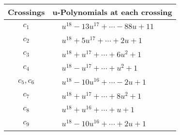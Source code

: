 \documentclass[1p]{elsarticle_modified}
\theoremstyle{definition}
\begin{document}
\begin{tabular}{m{50pt}|m{274pt}}
Crossings & \hspace{64pt}u-Polynomials at each crossing \\
\hline $$\begin{aligned}c_{1}\end{aligned}$$&$\begin{aligned}
&u^{18}-13 u^{17}+\cdots-88 u+11
\end{aligned}$\\
\hline $$\begin{aligned}c_{2}\end{aligned}$$&$\begin{aligned}
&u^{18}+5 u^{17}+\cdots+2 u+1
\end{aligned}$\\
\hline $$\begin{aligned}c_{3}\end{aligned}$$&$\begin{aligned}
&u^{18}+u^{17}+\cdots+6 u^2+1
\end{aligned}$\\
\hline $$\begin{aligned}c_{4}\end{aligned}$$&$\begin{aligned}
&u^{18}- u^{17}+\cdots+u^2+1
\end{aligned}$\\
\hline $$\begin{aligned}c_{5},c_{6}\end{aligned}$$&$\begin{aligned}
&u^{18}-10 u^{16}+\cdots-2 u+1
\end{aligned}$\\
\hline $$\begin{aligned}c_{7}\end{aligned}$$&$\begin{aligned}
&u^{18}+u^{17}+\cdots+8 u^2+1
\end{aligned}$\\
\hline $$\begin{aligned}c_{8}\end{aligned}$$&$\begin{aligned}
&u^{18}+u^{16}+\cdots+u+1
\end{aligned}$\\
\hline $$\begin{aligned}c_{9}\end{aligned}$$&$\begin{aligned}
&u^{18}-10 u^{16}+\cdots+2 u+1
\end{aligned}$\\

\end{tabular}
\end{document}
